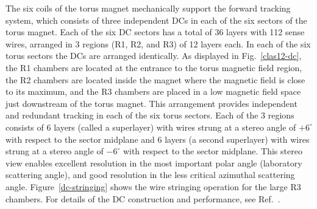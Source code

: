 \documentclass[final,3p,twocolumn]{elsarticle}
\begin{document}
The six coils of the torus magnet mechanically support the forward tracking system, which consists of three
independent DCs in each of the six sectors of the torus magnet. Each of the six DC sectors has a total of 36
layers with 112 sense wires, arranged in 3 regions (R1, R2, and R3) of 12 layers each. In each of the six torus
sectors the DCs are arranged identically. As displayed in Fig.~\ref{clas12-dc}, the R1 chambers are located at
the entrance to the torus magnetic field region, the R2 chambers are located inside the magnet where the
magnetic field is close to its maximum, and the R3 chambers are placed in a low magnetic field space just
downstream of the torus magnet. This arrangement provides independent and redundant tracking in each of the
six torus sectors. Each of the 3 regions consists of 6 layers (called a superlayer) with wires strung at a stereo
angle of $+6^\circ$ with respect to the sector midplane and 6 layers (a second superlayer) with wires strung at
a stereo angle of $-6^\circ$ with respect to the sector midplane. This stereo view enables excellent resolution in
the most important polar angle (laboratory scattering angle), and good resolution in the less critical azimuthal
scattering angle. Figure~\ref{dc-stringing} shows the wire stringing operation for the large R3 chambers. For
details of the DC construction and performance, see Ref.~\cite{DC}.
\end{document}
